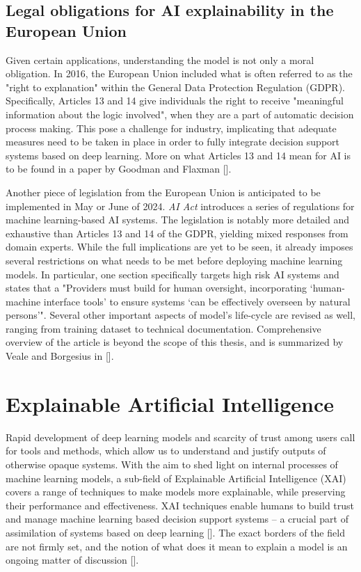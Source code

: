 \subsection*{Legal obligations for AI explainability in the European Union}

Given certain applications, understanding the model is not only a moral obligation. In 2016, the European Union included what is often referred to as the "right to explanation" within the General Data Protection Regulation (GDPR). Specifically, Articles 13 and 14 give individuals the right to receive "meaningful information about the logic involved", when they are a part of automatic decision process making.  This pose a challenge for industry, implicating that adequate measures need to be taken in place in order to fully integrate decision support systems based on deep learning. More on what Articles 13 and 14 mean for AI is to be found in a paper by Goodman and Flaxman [].


Another piece of legislation from the European Union is anticipated to be implemented in May or June of 2024. \emph{AI Act} introduces a series of regulations for machine learning-based AI systems. The legislation is notably more detailed and exhaustive than Articles 13 and 14 of the GDPR, yielding mixed responses from domain experts. While the full implications are yet to be seen, it already imposes several restrictions on what needs to be met before deploying machine learning models. In particular, one section specifically targets high risk AI systems and states that a "Providers must build for human oversight, incorporating ‘human-machine interface tools’ to ensure systems ‘can be effectively overseen by natural persons’". Several other important aspects of model's life-cycle are revised as well, ranging from training dataset to technical documentation. Comprehensive overview of the article is beyond the scope of this thesis, and is summarized by Veale and Borgesius in [].


\section{Explainable Artificial Intelligence}

Rapid development of deep learning models and scarcity of trust among users call for tools and methods, which allow us to understand and justify outputs of otherwise opaque systems. With the aim to shed light on internal processes of machine learning models, a sub-field of Explainable Artificial Intelligence (XAI) covers a range of techniques to make models more explainable, while preserving their performance and effectiveness. XAI techniques enable humans to build trust and manage machine learning based decision support systems -- a crucial part of assimilation of systems based on deep learning []. The exact borders of the field are not firmly set, and the notion of what does it mean to explain a model is an ongoing matter of discussion [].

